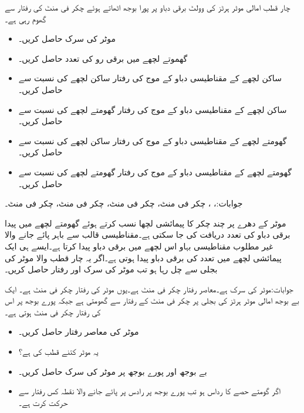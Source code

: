 چار قطب امالی موٹر  ہرٹز کی  وولٹ برقی دباو پر پورا بوجھ اٹھاتے ہوئے  چکر فی منٹ کی رفتار سے گھوم رہی ہے۔
\begin{itemize}
\item
موٹر کی سرک  حاصل کریں۔
\item
گھموتے لچھے میں برقی رو کی تعدد حاصل کریں۔
\item
ساکن لچھے کے مقناطیسی دباو کے موج کی رفتار ساکن لچھے کی نسبت سے حاصل کریں۔
\item
ساکن لچھے کے مقناطیسی دباو کے موج کی رفتار گھومتے لچھے کی نسبت سے حاصل کریں۔
\item
گھومتے لچھے کے مقناطیسی دباو کے موج کی رفتار ساکن لچھے کی نسبت سے حاصل کریں۔
\item
گھومتے لچھے کے مقناطیسی دباو کے موج کی رفتار گھومتے لچھے کی نسبت سے حاصل کریں۔
\end{itemize} 

جوابات:، ،  چکر فی منٹ،  چکر فی منٹ،  چکر فی منٹ،  چکر فی منٹ۔

موٹر کے دھرے پر چند چکر کا پیمائشی لچھا نسب کرتے ہوئے گھومتے لچھے میں پیدا برقی دباو  کی تعدد دریافت کی جا سکتی ہے۔مقناطیسی قالب سے باہر پائے جانے والا غیر مطلوب مقناطیسی بہاو اس لچھے میں برقی دباو پیدا کرتا ہے۔ایسے ہی ایک پیمائشی لچھے میں  تعدد  کی برقی دباو پیدا ہوتی ہے۔اگر یہ چار قطب والا موٹر  کی بجلی سے چل رہا ہو تب موٹر کی سرک اور رفتار حاصل کریں۔

 جوابات:موٹر کی سرک  ہے۔معاصر رفتار  چکر فی منٹ ہے۔یوں موٹر کی رفتار   چکر فی منٹ ہے۔
ایک بے بوجھ امالی موٹر  ہرٹز کی بجلی پر  چکر فی منٹ کے رفتار سے گھومتی ہے جبکہ پورے بوجھ پر اس کی رفتار   چکر فی منٹ ہوتی ہے۔
\begin{itemize}
\item
موٹر کی معاصر رفتار حاصل کریں۔ 
 \item
یہ موٹر کتنے قطب کی ہے؟
\item
بے بوجھ اور پورے بوجھ پر موٹر کی سرک حاصل کریں۔
\item
اگر گومتے حصے کا رداس  ہو تب پورے بوجھ پر رادس پر پائے جانے والا نقطہ کس رفتار سے حرکت کرت ہے۔ 
\end{itemize}

